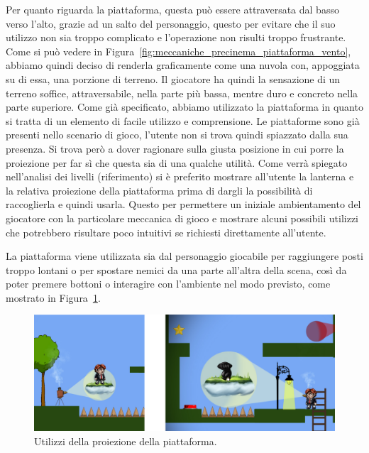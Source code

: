 Per quanto riguarda la piattaforma, questa può essere attraversata dal basso verso l’alto, grazie ad un salto del personaggio, questo per evitare che il suo utilizzo non sia troppo complicato e l’operazione non risulti troppo frustrante. Come si può vedere in Figura~\ref{fig:meccaniche_precinema_piattaforma_vento}, abbiamo quindi deciso di renderla graficamente come una nuvola con, appoggiata su di essa, una porzione di terreno. Il giocatore ha quindi la sensazione di un terreno soffice, attraversabile, nella parte più bassa, mentre duro e concreto nella parte superiore.
Come già specificato, abbiamo utilizzato la piattaforma in quanto si tratta di un elemento di facile utilizzo e comprensione. Le piattaforme sono già presenti nello scenario di gioco, l’utente non si trova quindi spiazzato dalla sua presenza. Si trova però a dover ragionare sulla giusta posizione in cui porre la proiezione per far sì che questa sia di una qualche utilità.
Come verrà spiegato nell’analisi dei livelli (riferimento) si è preferito mostrare all’utente la lanterna e la relativa proiezione della piattaforma prima di dargli la possibilità di raccoglierla e quindi usarla. Questo per permettere un iniziale ambientamento del giocatore con la particolare meccanica di gioco e mostrare alcuni possibili utilizzi che potrebbero risultare poco intuitivi se richiesti direttamente all’utente.

La piattaforma viene utilizzata sia dal personaggio giocabile per raggiungere posti troppo lontani o per spostare nemici da una parte all’altra della scena, così da poter premere bottoni o interagire con l’ambiente nel modo previsto, come mostrato in Figura~\ref{fig:meccaniche_precinema_piattaforma}.

\begin{figure}%
	\centering
	\includegraphics[width= \columnwidth]{images/gameDesign/19_piatt.jpg}
	\caption{Utilizzi della proiezione della piattaforma.}
	\label{fig:meccaniche_precinema_piattaforma}
\end{figure}


